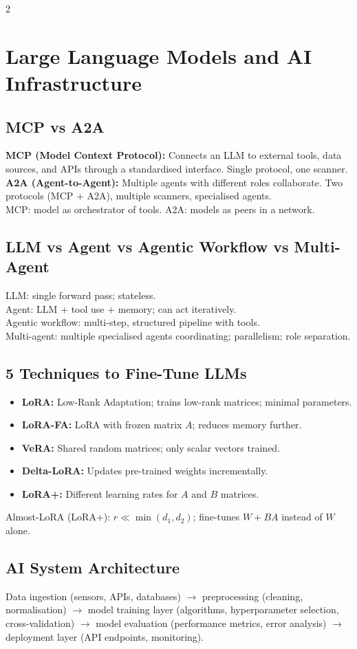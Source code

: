 \documentclass[10pt,a4paper]{article}
\begin{document}
\begin{multicols}{2}
\section{Large Language Models and AI Infrastructure}

\subsection{MCP vs A2A}
\textbf{MCP (Model Context Protocol):} Connects an LLM to external tools, data sources, and APIs through a standardised interface. Single protocol, one scanner.\\
\textbf{A2A (Agent-to-Agent):} Multiple agents with different roles collaborate. Two protocols (MCP + A2A), multiple scanners, specialised agents.\\
MCP: model as orchestrator of tools. A2A: models as peers in a network.

\subsection{LLM vs Agent vs Agentic Workflow vs Multi-Agent}
LLM: single forward pass; stateless.\\
Agent: LLM + tool use + memory; can act iteratively.\\
Agentic workflow: multi-step, structured pipeline with tools.\\
Multi-agent: multiple specialised agents coordinating; parallelism; role separation.

\subsection{5 Techniques to Fine-Tune LLMs}
\begin{itemize}
\item \textbf{LoRA:} Low-Rank Adaptation; trains low-rank matrices; minimal parameters.
\item \textbf{LoRA-FA:} LoRA with frozen matrix $A$; reduces memory further.
\item \textbf{VeRA:} Shared random matrices; only scalar vectors trained.
\item \textbf{Delta-LoRA:} Updates pre-trained weights incrementally.
\item \textbf{LoRA+:} Different learning rates for $A$ and $B$ matrices.
\end{itemize}
Almost-LoRA (LoRA+): $r \ll \min(d_1, d_2)$; fine-tunes $W + BA$ instead of $W$ alone.

\subsection{AI System Architecture}
Data ingestion (sensors, APIs, databases) $\to$ preprocessing (cleaning, normalisation) $\to$ model training layer (algorithms, hyperparameter selection, cross-validation) $\to$ model evaluation (performance metrics, error analysis) $\to$ deployment layer (API endpoints, monitoring).


\end{multicols}
\end{document}
